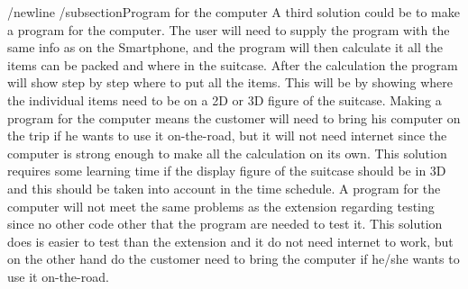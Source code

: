 /newline
/subsection{Program for the computer}
A third solution could be to make a program for the computer. The user will need to supply the program with the same info as on the Smartphone, and the program will then calculate it all the items can be packed and where in the suitcase. After the calculation the program will show step by step where to put all the items. This will be by showing where the individual items need to be on a 2D or 3D figure of the suitcase. Making a program for the computer means the customer will need to bring his computer on the trip if he wants to use it on-the-road, but it will not need internet since the computer is strong enough to make all the calculation on its own. This solution requires some learning time if the display figure of the suitcase should be in 3D and this should be taken into account in the time schedule. A program for the computer will not meet the same problems as the extension regarding testing since no other code other that the program are needed to test it. This solution does is easier to test than the extension and it do not need internet to work, but on the other hand do the customer need to bring the computer if he/she wants to use it on-the-road.  